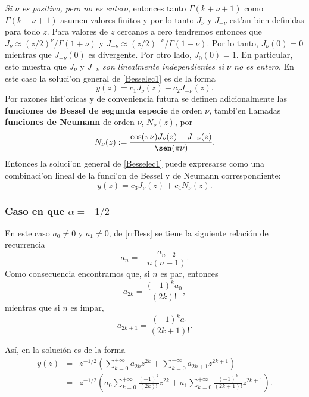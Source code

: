 \textit{Si $\nu$ es positivo, pero no es entero}, entonces tanto $\Gamma(k+\nu+1)$ como $\Gamma(k-\nu+1)$ asumen valores finitos y por lo tanto $J_\nu$ y $J_{-\nu}$ est'an bien definidas para todo $z$. Para valores de $z$ cercanos a cero tendremos entonces que $J_\nu\approx (z/2)^\nu/\Gamma(1+\nu)$ y $J_{-\nu}\approx (z/2)^{-\nu}/\Gamma(1-\nu)$. Por lo tanto, $J_\nu(0)=0$ mientras que  $J_{-\nu}(0)$ es divergente. Por otro lado, $J_0(0)=1$. En particular, esto muestra que $J_\nu$ y $J_{-\nu}$ \textit{son linealmente independientes si $\nu$ no es entero}.
En este caso la soluci'on general de \eqref{Besselec1} es de la forma
\begin{equation}
y(z)=c_1J_\nu(z)+c_2J_{-\nu}(z).
\end{equation}
Por razones hist'oricas y de conveniencia futura se definen adicionalmente las \textbf{funciones de Bessel de segunda especie} de orden $\nu$, tambi'en llamadas \textbf{funciones de Neumann} de orden $\nu$, $N_\nu(z)$, por
\begin{equation}
N_\nu(z):=\frac{\cos(\pi\nu)J_\nu(z)-J_{-\nu}(z)}{\sen(\pi\nu)}.
\end{equation}
Entonces la soluci'on general de \eqref{Besselec1} puede expresarse como una combinaci'on lineal de la funci'on de Bessel y de Neumann correspondiente:
\begin{equation}
y(z)=c_3J_\nu(z)+c_4N_\nu(z).
\end{equation}
\subsubsection{Caso en que $\alpha=-1/2$}

En este caso $a_0\neq 0$ y $a_1\neq 0$, de \eqref{rrBess} se tiene la siguiente relaci\'on de recurrencia
\begin{equation}
a_n=-\frac{a_{n-2}}{n(n-1)}.
\end{equation} 
Como consecuencia encontramos que, si $n$ es par, entonces
\begin{equation}
a_{2k}=\frac{(-1)^k a_0}{(2k)!},
\end{equation}
mientras que si $n$ es impar,
\begin{equation}
a_{2k+1}=\frac{(-1)^k a_1}{(2k+1)!}.
\end{equation}

As\'i, en la soluci\'on es de la forma
\begin{eqnarray}
y(z)&=&z^{-1/2}\left(\sum_{k=0}^{+\infty}a_{2k}z^{2k}+\sum_{k=0}^{+\infty}a_{2k+1}z^{2k+1} \right)\\
&=&z^{-1/2}\left(a_0\sum_{k=0}^{+\infty}\frac{(-1)^k}{(2k)!}z^{2k}+a_1\sum_{k=0}^{+\infty}\frac{(-1)^k}{(2k+1)!}z^{2k+1} \right).
\end{eqnarray}

